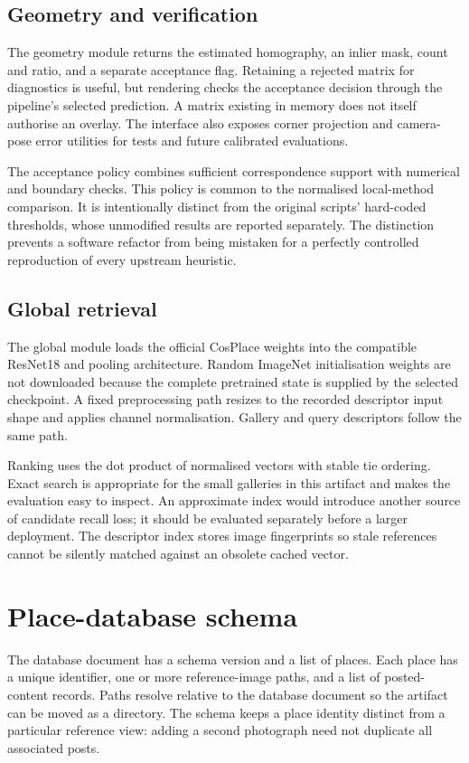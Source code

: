\subsection{Geometry and verification}
The geometry module returns the estimated homography, an inlier mask, count and ratio, and a separate acceptance flag. Retaining a rejected matrix for diagnostics is useful, but rendering checks the acceptance decision through the pipeline's selected prediction. A matrix existing in memory does not itself authorise an overlay. The interface also exposes corner projection and camera-pose error utilities for tests and future calibrated evaluations.

The acceptance policy combines sufficient correspondence support with numerical and boundary checks. This policy is common to the normalised local-method comparison. It is intentionally distinct from the original scripts' hard-coded thresholds, whose unmodified results are reported separately. The distinction prevents a software refactor from being mistaken for a perfectly controlled reproduction of every upstream heuristic.

\subsection{Global retrieval}
The global module loads the official CosPlace weights into the compatible ResNet18 and pooling architecture. Random ImageNet initialisation weights are not downloaded because the complete pretrained state is supplied by the selected checkpoint. A fixed preprocessing path resizes to the recorded descriptor input shape and applies channel normalisation. Gallery and query descriptors follow the same path.

Ranking uses the dot product of normalised vectors with stable tie ordering. Exact search is appropriate for the small galleries in this artifact and makes the evaluation easy to inspect. An approximate index would introduce another source of candidate recall loss; it should be evaluated separately before a larger deployment. The descriptor index stores image fingerprints so stale references cannot be silently matched against an obsolete cached vector.

\section{Place-database schema}
The database document has a schema version and a list of places. Each place has a unique identifier, one or more reference-image paths, and a list of posted-content records. Paths resolve relative to the database document so the artifact can be moved as a directory. The schema keeps a place identity distinct from a particular reference view: adding a second photograph need not duplicate all associated posts.

